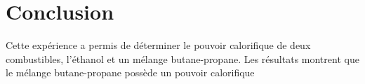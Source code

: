 \section{Conclusion}

Cette expérience a permis de déterminer le pouvoir calorifique de deux combustibles, l'éthanol et un mélange butane-propane. Les résultats montrent que le mélange butane-propane possède un pouvoir calorifique 